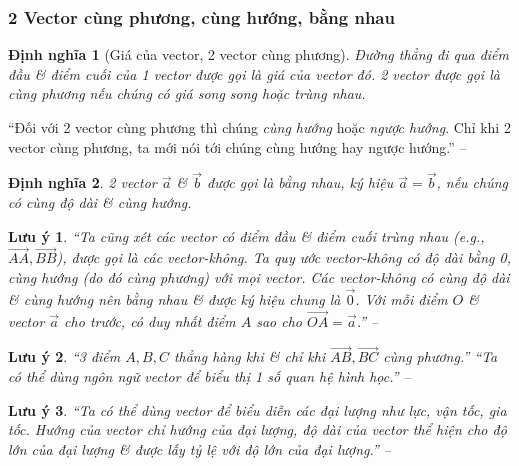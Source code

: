 \documentclass{article}
\numberwithin{equation}{section}
\newtheorem{definition}{Định nghĩa}[section]
\newtheorem{remark}{Lưu ý}[section]
\begin{document}
\subsubsection{2 Vector cùng phương, cùng hướng, bằng nhau}

\begin{definition}[Giá của vector, 2 vector cùng phương]
	Đường thẳng đi qua điểm đầu \& điểm cuối của 1 vector được gọi là \emph{giá} của vector đó. 2 vector được gọi là \emph{cùng phương} nếu chúng có giá song song hoặc trùng nhau.
\end{definition}
``Đối với 2 vector cùng phương thì chúng \textit{cùng hướng} hoặc \textit{ngược hướng}. Chỉ khi 2 vector cùng phương, ta mới nói tới chúng cùng hướng hay ngược hướng.'' -- \cite[p. 48]{Khoai_Anh_Tan_Thang_Anh_Cuong_Duong_Dang_Ha_Hanh_Hong_Son_Tuan_Vuong_Toan_10_tap_1}

\begin{definition}
	2 vector $\vec{a}$ \& $\vec{b}$ được gọi là \emph{bằng nhau}, ký hiệu $\vec{a} = \vec{b}$, nếu chúng có cùng độ dài \& cùng hướng.
\end{definition}

\begin{remark}
	``Ta cũng xét các vector có điểm đầu \& điểm cuối trùng nhau (e.g., $\overrightarrow{AA},\overrightarrow{BB}$), được gọi là các \emph{vector-không}. Ta quy ước vector-không có độ dài bằng 0, cùng hướng (do đó cùng phương) với mọi vector. Các vector-không có cùng độ dài \& cùng hướng nên bằng nhau \& được ký hiệu chung là $\vec{0}$. Với mỗi điểm $O$ \& vector $\vec{a}$ cho trước, có duy nhất điểm $A$ sao cho $\overrightarrow{OA} = \vec{a}$.'' -- \cite[p. 48]{Khoai_Anh_Tan_Thang_Anh_Cuong_Duong_Dang_Ha_Hanh_Hong_Son_Tuan_Vuong_Toan_10_tap_1}
\end{remark}

\begin{remark}
	``3 điểm $A,B,C$ thẳng hàng khi \& chỉ khi $\overrightarrow{AB},\overrightarrow{BC}$ cùng phương.'' ``Ta có thể dùng ngôn ngữ vector để biểu thị 1 số quan hệ hình học.'' -- \cite[p. 49]{Khoai_Anh_Tan_Thang_Anh_Cuong_Duong_Dang_Ha_Hanh_Hong_Son_Tuan_Vuong_Toan_10_tap_1}
\end{remark}

\begin{remark}
	``Ta có thể dùng vector để biểu diễn các đại lượng như lực, vận tốc, gia tốc. Hướng của vector chỉ hướng của đại lượng, độ dài của vector thể hiện cho độ lớn của đại lượng \& được lấy tỷ lệ với độ lớn của đại lượng.'' -- \cite[p. 49]{Khoai_Anh_Tan_Thang_Anh_Cuong_Duong_Dang_Ha_Hanh_Hong_Son_Tuan_Vuong_Toan_10_tap_1}
\end{remark}
\end{document}
